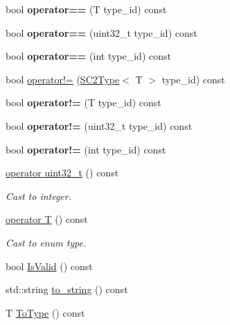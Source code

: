 \begin{DoxyCompactItemize}
bool {\bfseries operator==} (T type\+\_\+id) const
\item 
\mbox{\label{classsc2_1_1_s_c2_type_a4dcadbfd52b9acde5f49b2d452ac08fa}} 
bool {\bfseries operator==} (uint32\+\_\+t type\+\_\+id) const
\item 
\mbox{\label{classsc2_1_1_s_c2_type_ade586b36531920f32527128774df00b7}} 
bool {\bfseries operator==} (int type\+\_\+id) const
\item 
bool \hyperlink{classsc2_1_1_s_c2_type_a6e032550a699843364b52d9f30d7ddcc}{operator!=} (\hyperlink{classsc2_1_1_s_c2_type}{S\+C2\+Type}$<$ T $>$ type\+\_\+id) const
\item 
\mbox{\label{classsc2_1_1_s_c2_type_af18f2a54f07829ae2cc8501301f1764f}} 
bool {\bfseries operator!=} (T type\+\_\+id) const
\item 
\mbox{\label{classsc2_1_1_s_c2_type_afa64fdd5adf5eca49d3a95826e884fa1}} 
bool {\bfseries operator!=} (uint32\+\_\+t type\+\_\+id) const
\item 
\mbox{\label{classsc2_1_1_s_c2_type_a8195d6f42d7e7c193bf08dbd146ef22c}} 
bool {\bfseries operator!=} (int type\+\_\+id) const
\item 
\mbox{\label{classsc2_1_1_s_c2_type_ab75e39605288070327604d10a5f720bf}} 
\hyperlink{classsc2_1_1_s_c2_type_ab75e39605288070327604d10a5f720bf}{operator uint32\+\_\+t} () const
\begin{DoxyCompactList}\small\item\em Cast to integer. \end{DoxyCompactList}\item 
\mbox{\label{classsc2_1_1_s_c2_type_a16ef14791e484bcb2708d262fbfbc46f}} 
\hyperlink{classsc2_1_1_s_c2_type_a16ef14791e484bcb2708d262fbfbc46f}{operator T} () const
\begin{DoxyCompactList}\small\item\em Cast to enum type. \end{DoxyCompactList}\item 
bool \hyperlink{classsc2_1_1_s_c2_type_a359fd3f5911b611089dac072f2ba528f}{Is\+Valid} () const
\item 
std\+::string \hyperlink{classsc2_1_1_s_c2_type_a25533b72e301be4064d80a13c82dc506}{to\+\_\+string} () const
\item 
T \hyperlink{classsc2_1_1_s_c2_type_ada2d70972edaa615780f86165b7e87a3}{To\+Type} () const
\end{DoxyCompactItemize}


